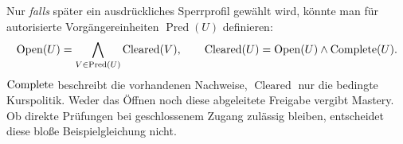 Nur \emph{falls} später ein ausdrückliches Sperrprofil gewählt wird, könnte
man für autorisierte Vorgängereinheiten $\operatorname{Pred}(U)$ definieren:
\[
 \operatorname{Open}(U)=\bigwedge_{V\in\operatorname{Pred}(U)}
      \operatorname{Cleared}(V),\qquad
 \operatorname{Cleared}(U)=\operatorname{Open}(U)\land\operatorname{Complete}(U).
\]
$\operatorname{Complete}$ beschreibt die vorhandenen Nachweise, $\operatorname{Cleared}$
nur die bedingte Kurspolitik. Weder das Öffnen noch diese abgeleitete
Freigabe vergibt Mastery. Ob direkte Prüfungen bei geschlossenem Zugang
zulässig bleiben, entscheidet diese bloße Beispielgleichung nicht.

